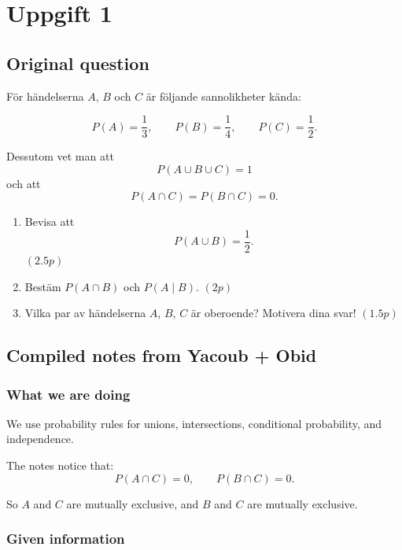 \documentclass[10pt]{article}
\begin{document}
\section*{Uppgift 1}

\subsection*{Original question}

För händelserna \(A\), \(B\) och \(C\) är följande
sannolikheter kända:

\[
P(A)=\frac{1}{3},
\qquad
P(B)=\frac{1}{4},
\qquad
P(C)=\frac{1}{2}.
\]

Dessutom vet man att
\[
P(A\cup B\cup C)=1
\]
och att
\[
P(A\cap C)=P(B\cap C)=0.
\]

\begin{enumerate}[label=\alph*)]
\item Bevisa att
\[
P(A\cup B)=\frac{1}{2}.
\]
\hfill \((2.5p)\)

\item Bestäm \(P(A\cap B)\) och \(P(A\mid B)\).
\hfill \((2p)\)

\item Vilka par av händelserna \(A\), \(B\), \(C\)
är oberoende? Motivera dina svar!
\hfill \((1.5p)\)
\end{enumerate}

\subsection*{Compiled notes from Yacoub + Obid}

\subsubsection*{What we are doing}

We use probability rules for unions,
intersections, conditional probability, and
independence.

The notes notice that:
\[
P(A\cap C)=0,
\qquad
P(B\cap C)=0.
\]

So \(A\) and \(C\) are mutually exclusive, and
\(B\) and \(C\) are mutually exclusive.

\subsubsection*{Given information}
\end{document}
